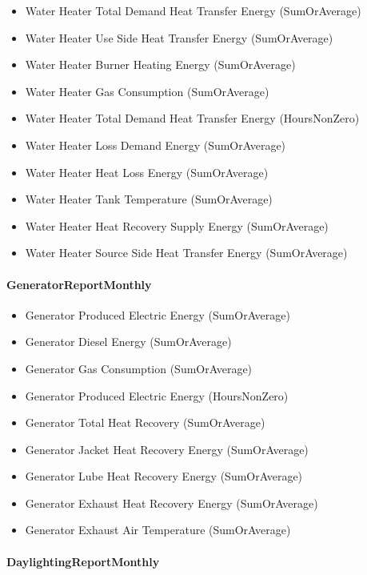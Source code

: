 \begin{itemize}
\item
  Water Heater Total Demand Heat Transfer Energy (SumOrAverage)
\item
  Water Heater Use Side Heat Transfer Energy (SumOrAverage)
\item
  Water Heater Burner Heating Energy (SumOrAverage)
\item
  Water Heater Gas Consumption (SumOrAverage)
\item
  Water Heater Total Demand Heat Transfer Energy (HoursNonZero)
\item
  Water Heater Loss Demand Energy (SumOrAverage)
\item
  Water Heater Heat Loss Energy (SumOrAverage)
\item
  Water Heater Tank Temperature (SumOrAverage)
\item
  Water Heater Heat Recovery Supply Energy (SumOrAverage)
\item
  Water Heater Source Side Heat Transfer Energy (SumOrAverage)
\end{itemize}

\paragraph{GeneratorReportMonthly}\label{generatorreportmonthly}

\begin{itemize}
\item
  Generator Produced Electric Energy (SumOrAverage)
\item
  Generator Diesel Energy (SumOrAverage)
\item
  Generator Gas Consumption (SumOrAverage)
\item
  Generator Produced Electric Energy (HoursNonZero)
\item
  Generator Total Heat Recovery (SumOrAverage)
\item
  Generator Jacket Heat Recovery Energy (SumOrAverage)
\item
  Generator Lube Heat Recovery Energy (SumOrAverage)
\item
  Generator Exhaust Heat Recovery Energy (SumOrAverage)
\item
  Generator Exhaust Air Temperature (SumOrAverage)
\end{itemize}

\paragraph{DaylightingReportMonthly}\label{daylightingreportmonthly}

